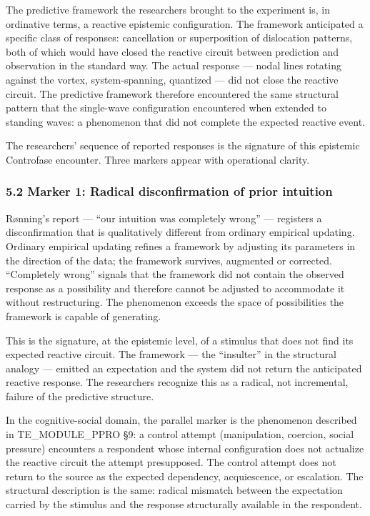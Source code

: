 \documentclass[
  11pt,
  a4paper,
]{article}
\begin{document}
The predictive framework the researchers brought to the experiment is,
in ordinative terms, a reactive epistemic configuration. The framework
anticipated a specific class of responses: cancellation or superposition
of dislocation patterns, both of which would have closed the reactive
circuit between prediction and observation in the standard way. The
actual response --- nodal lines rotating against the vortex,
system-spanning, quantized --- did not close the reactive circuit. The
predictive framework therefore encountered the same structural pattern
that the single-wave configuration encountered when extended to standing
waves: a phenomenon that did not complete the expected reactive event.

The researchers' sequence of reported responses is the signature of this
epistemic Controfase encounter. Three markers appear with operational
clarity.

\subsubsection{5.2 Marker 1: Radical disconfirmation of prior
intuition}\label{marker-1-radical-disconfirmation-of-prior-intuition}

Rønning's report --- ``our intuition was completely wrong'' ---
registers a disconfirmation that is qualitatively different from
ordinary empirical updating. Ordinary empirical updating refines a
framework by adjusting its parameters in the direction of the data; the
framework survives, augmented or corrected. ``Completely wrong'' signals
that the framework did not contain the observed response as a
possibility and therefore cannot be adjusted to accommodate it without
restructuring. The phenomenon exceeds the space of possibilities the
framework is capable of generating.

This is the signature, at the epistemic level, of a stimulus that does
not find its expected reactive circuit. The framework --- the
``insulter'' in the structural analogy --- emitted an expectation and
the system did not return the anticipated reactive response. The
researchers recognize this as a radical, not incremental, failure of the
predictive structure.

In the cognitive-social domain, the parallel marker is the phenomenon
described in TE\_MODULE\_PPRO §9: a control attempt (manipulation,
coercion, social pressure) encounters a respondent whose internal
configuration does not actualize the reactive circuit the attempt
presupposed. The control attempt does not return to the source as the
expected dependency, acquiescence, or escalation. The structural
description is the same: radical mismatch between the expectation
carried by the stimulus and the response structurally available in the
respondent.
\end{document}
